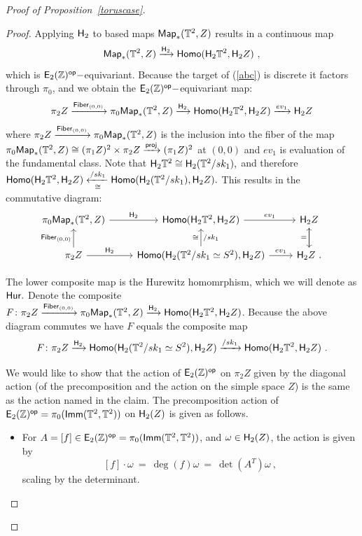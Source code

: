 \begin{proof}[Proof of Proposition~\ref{toruscase}]
\begin{proof}
Applying $\mathsf H_{2}$ to based maps ${\sf Map}_{\ast}(\mathbb T^{2}, Z)$ results in a continuous map
\begin{equation} \label{abc}
{\sf Map}_{\ast}(\mathbb T^{2}, Z) \xrightarrow{\mathsf H_{2}} {\sf Homo}(\mathsf H_{2}\mathbb T^{2}, \mathsf H_{2}Z)~,
\end{equation}
which is $\mathsf E_2(\mathbb Z)^{\operatorname{\mathsf{op}}}-$equivariant. Because the target of (\ref{abc}) is discrete it factors through $\pi_{0}$, and we obtain the $\mathsf E_2(\mathbb Z)^{\operatorname{\mathsf{op}}}-$equivariant map:
\begin{equation} \label{Hureq}
\pi_{2}Z \xrightarrow{{\sf Fiber}_{(0, 0)}} \pi_{0}{\sf Map}_{\ast}(\mathbb T^{2}, Z) \xrightarrow{\mathsf H_{2}}  {\sf Homo}(\mathsf H_{2}\mathbb T^{2}, \mathsf H_{2}Z) \xrightarrow{ev_{1}} \mathsf H_{2}Z
\end{equation}
where $\pi_{2}Z \xrightarrow{{\sf Fiber}_{(0, 0)}} \pi_{0}{\sf Map}_{\ast}(\mathbb T^{2}, Z)$ is the inclusion into the fiber of the map $\pi_{0}{\sf Map}_{\ast}(\mathbb T^{2}, Z) \cong (\pi_{1}Z)^{2} \times \pi_{2}Z \xrightarrow{\sf proj} (\pi_{1}Z)^{2}$ at $(0, 0)$ and $ev_{1}$ is evaluation of the fundamental class. Note that $\mathsf H_{2}\mathbb T^{2} \cong \mathsf H_{2}(\mathbb T^{2}/sk_{1}),$ and therefore ${\sf Homo}(\mathsf H_{2}\mathbb T^{2}, \mathsf H_{2}Z) \xleftarrow[\cong]{/sk_{1}} {\sf Homo}(\mathsf H_{2}(\mathbb T^{2}/sk_{1}), \mathsf H_{2}Z).$ This results in the commutative diagram:
\begin{equation} \label{bigdi}
\begin{tikzcd} 
\pi_{0}{\sf Map}_{\ast}(\TT^{2}, Z) \arrow[r, "\sH_{2}"] & {\sf Homo}(\sH_{2}\TT^{2}, \sH_{2}Z) \arrow[r, "ev_{1}"]  & \sH_{2}Z  \arrow[d, ""]\\
\pi_2Z \arrow[r, "\sH_{2}"]  \arrow[u, "{\sf Fiber}_{(0, 0)}"]&  {\sf Homo}(\sH_{2}(\TT^{2}/sk_{1} \simeq S^{2}), \sH_{2}Z) \arrow[u, "\cong", "/sk_{1}"'] \arrow[r, "ev_{1}"] & \sH_{2}Z \arrow[u, "="]~.
\end{tikzcd}
\end{equation}

The lower composite map is the Hurewitz homomrphism, which we will denote as ${\sf Hur}.$ 
Denote the composite $F \colon \pi_{2}Z \xrightarrow{{\sf Fiber}_{(0, 0)}} \pi_{0}{\sf Map}_{\ast}(\mathbb T^{2}, Z) \xrightarrow{\mathsf H_{2}}  {\sf Homo}(\mathsf H_{2}\mathbb T^{2}, \mathsf H_{2}Z)$. Because the above diagram commutes we have $F$ equals the composite map
\[
F\colon
\pi_{2}Z \xrightarrow{\mathsf H_{2}} {\sf Homo}(\mathsf H_{2}(\mathbb T^{2}/sk_{1} \simeq S^{2}), \mathsf H_{2}Z)  \xrightarrow{/sk_{1}} {\sf Homo}(\mathsf H_{2}\mathbb T^{2}, \mathsf H_{2}Z)~.
\] 



We would like to show that the action of ${\sf E}_2(\mathbb Z)^{\operatorname{\mathsf{op}}}$ on $\pi_{2}Z$ given by the diagonal action (of the precomposition and the action on the simple space $Z$) is the same as the action named in the claim.
The precomposition action of $\mathsf E_2(\mathbb Z)^{\operatorname{\mathsf{op}}} = \pi_0(\operatorname{\sf Imm}(\mathbb T^2,\mathbb T^2))$ on $\mathsf H_2(Z)$ is given as follows.
\begin{itemize}
\item[]
For $A = [f] \in \mathsf E_2(\mathbb Z)^{\operatorname{\mathsf{op}}} = \pi_0(\operatorname{\sf Imm}(\mathbb T^2,\mathbb T^2))$, and $\omega \in \mathsf H_2(Z)$, the action is given by
\[
[f] \cdot \omega 
~=~ 
\deg(f) \omega
~=~
\det(A^T) \omega
~,
\]
scaling by the determinant.  


\end{itemize}
\end{proof}
\end{proof}
